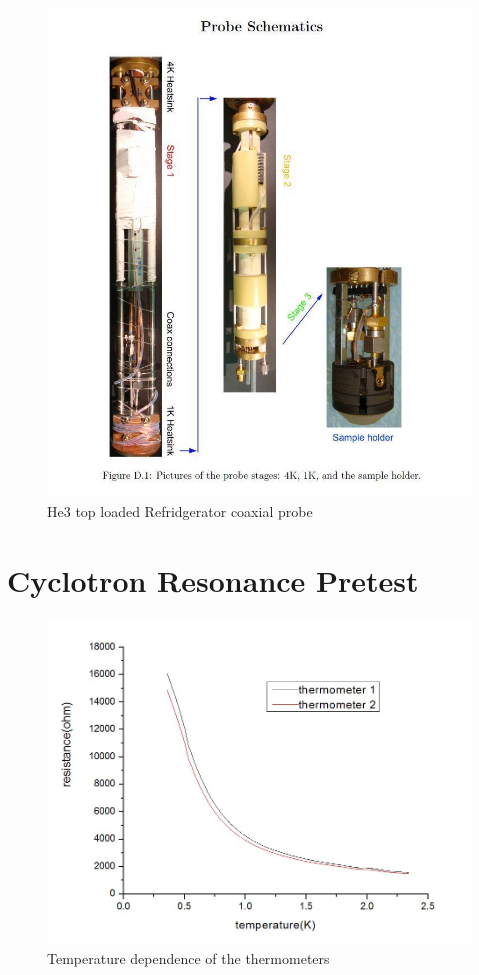 \documentclass[12pt]{ruthesis}
\begin{document}
 
\begin{figure}
  \centering
  \includegraphics[totalheight=8cm]{figures/probe.JPG}
  \caption{He3 top loaded Refridgerator coaxial probe}
  \label{probe}
\end{figure}
 
 
 
 
 
 


\section{Cyclotron Resonance Pretest}\label{Cyclotron}

\begin{figure}
  \centering
  \includegraphics[totalheight=8cm]{figures/R(T).JPG}
  \caption{Temperature dependence of the thermometers}
  \label{r(t)}
\end{figure}
 
\end{document}
